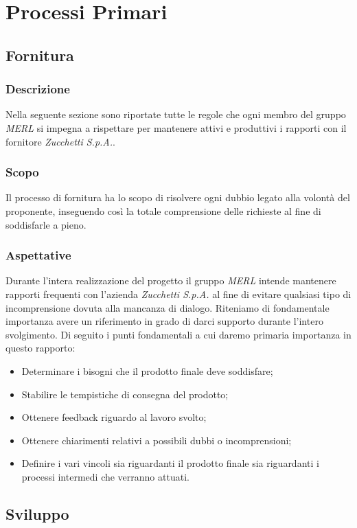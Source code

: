 \chapter{Processi Primari}

\section{Fornitura}
\subsection{Descrizione}
Nella seguente sezione sono riportate tutte le regole che ogni membro del gruppo \textit{MERL} si impegna a rispettare per mantenere attivi e produttivi i rapporti con il fornitore \textit{Zucchetti S.p.A.}.

\subsection{Scopo}
Il processo di fornitura ha lo scopo di risolvere ogni dubbio legato alla volontà del proponente, inseguendo così la totale comprensione delle richieste al fine di soddisfarle a pieno.

\subsection{Aspettative}
Durante l'intera realizzazione del progetto il gruppo \textit{MERL} intende mantenere rapporti frequenti con l'azienda \textit{Zucchetti S.p.A.} al fine di evitare qualsiasi tipo di incomprensione dovuta alla mancanza di dialogo. Riteniamo di fondamentale importanza avere un riferimento in grado di darci supporto durante l'intero svolgimento. Di seguito i punti fondamentali a cui daremo primaria importanza in questo rapporto:
\begin{itemize}
 \item Determinare i bisogni che il prodotto finale deve soddisfare;
 \item Stabilire le tempistiche di consegna del prodotto;
 \item Ottenere feedback riguardo al lavoro svolto;
 \item Ottenere chiarimenti relativi a possibili dubbi o incomprensioni;
 \item Definire i vari vincoli sia riguardanti il prodotto finale sia riguardanti i processi intermedi che verranno attuati.
\end{itemize}

\section{Sviluppo}

